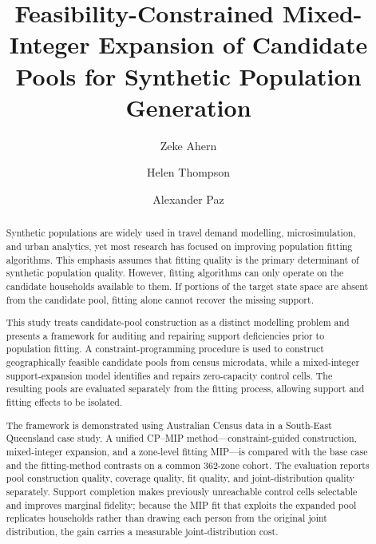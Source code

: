 \documentclass[review]{elsarticle}
\begin{document}

\begin{frontmatter}

\author{Zeke Ahern}

\title{Feasibility-Constrained Mixed-Integer Expansion of Candidate Pools for Synthetic Population Generation}

\author{Helen Thompson}
\author{Alexander Paz}


\begin{abstract}
Synthetic populations are widely used in travel demand modelling,
microsimulation, and urban analytics, yet most research has focused on improving
population fitting algorithms. This emphasis assumes that fitting quality is the
primary determinant of synthetic population quality. However, fitting algorithms
can only operate on the candidate households available to them. If portions of
the target state space are absent from the candidate pool, fitting alone cannot
recover the missing support.

This study treats candidate-pool construction as a distinct modelling problem
and presents a framework for auditing and repairing support deficiencies prior
to population fitting. A constraint-programming procedure is used to construct
geographically feasible candidate pools from census microdata, while a
mixed-integer support-expansion model identifies and repairs zero-capacity
control cells. The resulting pools are evaluated separately from the fitting
process, allowing support and fitting effects to be isolated.

The framework is demonstrated using Australian Census data in a South-East
Queensland case study. A unified CP--MIP method---constraint-guided
construction, mixed-integer expansion, and a zone-level fitting MIP---is
compared with the base case and the fitting-method contrasts on a common
362-zone cohort. The evaluation reports pool construction quality, coverage
quality, fit quality, and joint-distribution quality separately. Support
completion makes previously unreachable control cells selectable and improves
marginal fidelity; because the MIP fit that exploits the expanded pool
replicates households rather than drawing each person from the original joint
distribution, the gain carries a measurable joint-distribution cost.


\end{abstract}
\end{frontmatter}
\end{document}
